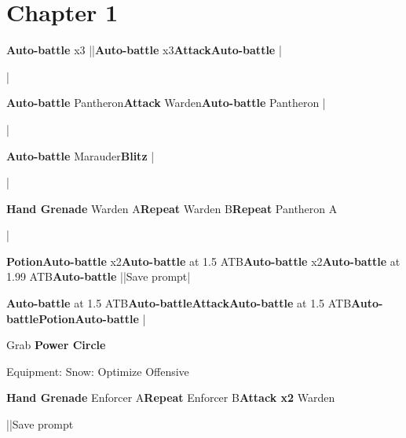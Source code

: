 \section{Chapter 1}

\begin{mainlist}
	\item {}
	\item {} \textbf{Auto-battle} x3 |\skip |\textbf{Auto-battle} x3\to\textbf{Attack}\to\textbf{Auto-battle} |\skip
	\item \skip|\skip
	\item {} \textbf{Auto-battle} Pantheron\to\textbf{Attack} Warden\to\textbf{Auto-battle} Pantheron |\skip
	\item \skip|\skip
	\item {} \textbf{Auto-battle} Marauder\to \textbf{Blitz} |
	\item \skip|\skip
	\item {} \textbf{Hand Grenade} Warden A\to\textbf{Repeat} Warden B\to\textbf{Repeat} Pantheron A
	\item \skip|\skip
	\item {} \textbf{Potion}\to \textbf{Auto-battle} x2\to \textbf{Auto-battle} at 1.5 ATB\to \textbf{Auto-battle} x2\to \textbf{Auto-battle} at 1.99 ATB\to \textbf{Auto-battle} |\skip|Save prompt|\skip
	\item {} \textbf{Auto-battle} at 1.5 ATB\to \textbf{Auto-battle}\to \textbf{Attack}\to \textbf{Auto-battle} at 1.5 ATB\to \textbf{Auto-battle}\to \textbf{\textbf{Potion}}\to \textbf{Auto-battle} |
	\item Grab \textbf{Power Circle}
\end{mainlist}
\begin{menu}
	\item Equipment: Snow: Optimize Offensive
\end{menu}
\begin{mainlist}
	\item \skip
	\item {} \textbf{Hand Grenade} Enforcer A\to \textbf{Repeat} Enforcer B\to \textbf{Attack x2} Warden
	\item {}|\skip|Save prompt
\end{mainlist}
